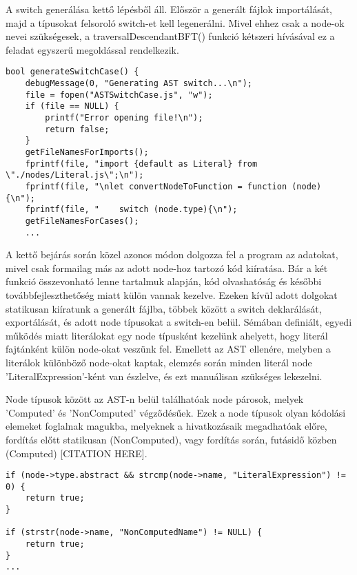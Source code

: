 A switch generálása kettő lépésből áll. Először a generált fájlok importálását, majd a típusokat felsoroló switch-et kell legenerálni. Mivel ehhez csak a node-ok nevei szükségesek, a traversalDescendantBFT() funkció kétszeri hívásával ez a feladat egyszerű megoldással rendelkezik.

\begin{lstlisting}[caption={Absztrakt és speciális node szűrés},label={lst:computedfiltering}, style={CStyle}]
bool generateSwitchCase() {
    debugMessage(0, "Generating AST switch...\n");
    file = fopen("ASTSwitchCase.js", "w");
    if (file == NULL) {
        printf("Error opening file!\n");
        return false;
    }
    getFileNamesForImports();
    fprintf(file, "import {default as Literal} from \"./nodes/Literal.js\";\n");
    fprintf(file, "\nlet convertNodeToFunction = function (node) {\n");
    fprintf(file, "    switch (node.type){\n");
    getFileNamesForCases();
    ...
\end{lstlisting}

A kettő bejárás során közel azonos módon dolgozza fel a program az adatokat, mivel csak formailag más az adott node-hoz tartozó kód kiíratása. Bár a két funkció összevonható lenne tartalmuk alapján, kód olvashatóság és későbbi továbbfejleszthetőség miatt külön vannak kezelve.
Ezeken kívül adott dolgokat statikusan kiíratunk a generált fájlba, többek között a switch deklarálását, exportálását, és adott node típusokat a switch-en belül. Sémában definiált, egyedi működés miatt literálokat egy node típusként kezelünk ahelyett, hogy literál fajtánként külön node-okat veszünk fel. Emellett az AST ellenére, melyben a literálok különböző node-okat kaptak, elemzés során minden literál node 'LiteralExpression'-ként van észlelve, és ezt manuálisan szükséges lekezelni.

Node típusok között az AST-n belül találhatóak node párosok, melyek 'Computed' és 'NonComputed' végződésűek. Ezek a node típusok olyan kódolási elemeket foglalnak magukba, melyeknek a hivatkozásaik megadhatóak előre, fordítás előtt statikusan (NonComputed), vagy fordítás során, futásidő közben (Computed) [CITATION HERE].

\begin{lstlisting}[caption={Absztrakt és speciális node szűrés},label={lst:abs-computedfiltering}, style={CStyle}]
if (node->type.abstract && strcmp(node->name, "LiteralExpression") != 0) {
    return true;
}

if (strstr(node->name, "NonComputedName") != NULL) {
    return true;
}
...
\end{lstlisting}

